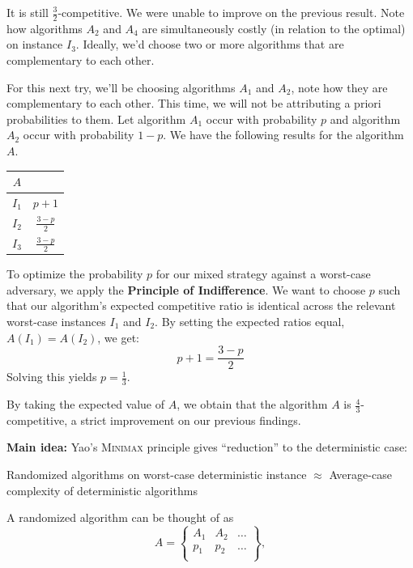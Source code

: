 \documentclass[14pt]{extreport}
\begin{document}
    It is still $\frac{3}{2}$-competitive. We were unable to improve on the previous result. Note how algorithms $A_2$ and $A_4$ are simultaneously costly (in relation to the optimal) on instance $I_3$. Ideally, we'd choose two or more algorithms that are complementary to each other.

    \vspace{5mm}
    For this next try, we'll be choosing algorithms $A_1$ and $A_2$, note how they are complementary to each other. This time, we will not be attributing a priori probabilities to them. Let algorithm $A_1$ occur with probability $p$ and algorithm $A_2$ occur with probability $1 - p$. We have the following results for the algorithm $A$.
    
    \begin{center}
    \begin{tabular}{c|c}
    $A$ &  \\
    \hline
    $I_1$ & $p + 1$ \\
    $I_2$ & $\frac{3-p}{2}$ \\
    $I_3$ & $\frac{3-p}{2}$ \\
    \end{tabular}
    \end{center}
    
    To optimize the probability $p$ for our mixed strategy against a worst-case adversary, we apply the \textbf{Principle of Indifference}. We want to choose $p$ such that our algorithm's expected competitive ratio is identical across the relevant worst-case instances $I_1$ and $I_2$. By setting the expected ratios equal, $A(I_1) = A(I_2)$, we get:
    $$p + 1 = \frac{3-p}{2}$$
    Solving this yields $p = \frac{1}{3}$.
    
    \vspace{5mm}
    By taking the expected value of $A$, we obtain that the algorithm $A$ is $\frac{4}{3}$-competitive, a strict improvement on our previous findings.

    \vspace{5mm}
    \textbf{Main idea:} Yao's \textsc{Minimax} principle gives ``reduction'' to the deterministic case:

    \vspace{5mm}
    Randomized algorithms on worst-case deterministic instance $\approx$ Average-case complexity of deterministic algorithms

\vspace{5mm}
A randomized algorithm can be thought of as
\[
A = \left\{ \begin{array}{ccc}
A_1 & A_2 & \ldots \\
p_1 & p_2 & \ldots \\
\end{array} \right\},
\]
\end{document}
